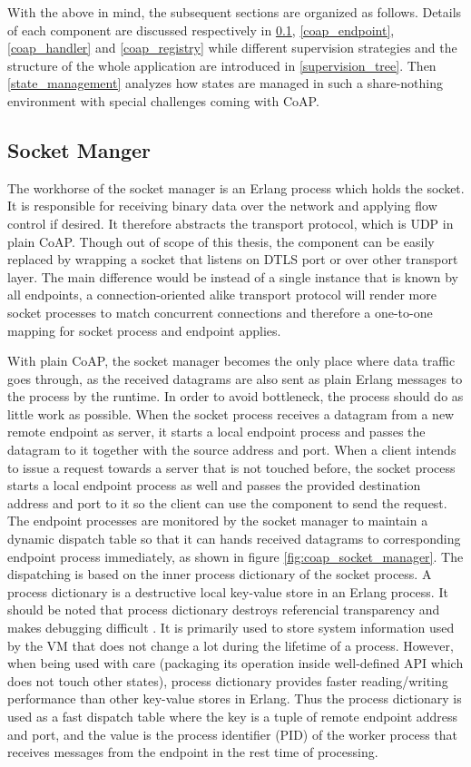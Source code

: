 With the above in mind, the subsequent sections are organized as follows. Details of each component are discussed respectively in \ref{socket_manager}, \ref{coap_endpoint}, \ref{coap_handler} and \ref{coap_registry} while different supervision strategies and the structure of the whole application are introduced in \ref{supervision_tree}. Then \ref{state_management} analyzes how states are managed in such a share-nothing environment with special challenges coming with CoAP. 

\subsection{Socket Manger}\label{socket_manager}

The workhorse of the socket manager is an Erlang process which holds the socket. It is responsible for receiving binary data over the network and applying flow control if desired. 
It therefore abstracts the transport protocol, which is UDP in plain CoAP. Though out of scope of this thesis, the component can be easily replaced by wrapping a socket that listens on DTLS port or over other transport layer. The main difference would be instead of a single instance that is known by all endpoints, a connection-oriented alike transport protocol will render more socket processes to match concurrent connections and therefore a one-to-one mapping for socket process and endpoint applies. 

With plain CoAP, the socket manager becomes the only place where data traffic goes through, as the received datagrams are also sent as plain Erlang messages to the process by the runtime. In order to avoid bottleneck, the process should do as little work as possible. When the socket process receives a datagram from a new remote endpoint as server, it starts a local endpoint process and passes the datagram to it together with the source address and port. When a client intends to issue a request towards a server that is not touched before, the socket process starts a local endpoint process as well and passes the provided destination address and port to it so the client can use the component to send the request. The endpoint processes are monitored by the socket manager to maintain a dynamic dispatch table so that it can hands received datagrams to corresponding endpoint process immediately, as shown in figure \ref{fig:coap_socket_manager}. The dispatching is based on the inner process dictionary of the socket process. A process dictionary is a destructive local key-value store in an Erlang process. It should be noted that process dictionary destroys referencial transparency and makes debugging difficult \cite{erl_proc_dict}. It is primarily used to store system information used by the VM that does not change a lot during the lifetime of a process. However, when being used with care (packaging its operation inside well-defined API which does not touch other states), process dictionary provides faster reading/writing performance than other key-value stores in Erlang. Thus the process dictionary is used as a fast dispatch table where the key is a tuple of remote endpoint address and port, and the value is the process identifier (PID) of the worker process that receives messages from the endpoint in the rest time of processing. 

